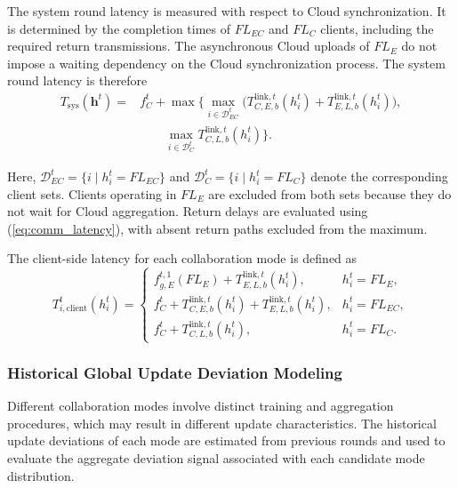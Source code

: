 \documentclass[5p,times]{elsarticle}
\theoremstyle{plain}
\theoremstyle{definition}
\theoremstyle{remark}
\begin{document}
	
	The system round latency is measured
	with respect to Cloud synchronization.
	It is determined by the completion times
	of $FL_{EC}$ and $FL_C$ clients, including
	the required return transmissions.
	The asynchronous Cloud uploads of $FL_E$
	do not impose a waiting dependency on
	the Cloud synchronization process.
	The system round latency is therefore
	\begin{equation}
		\begin{aligned}
			T_{\mathrm{sys}}(\mathbf h^t)
			={}&f_C^t+\max\Bigg\{
			\max_{i\in\mathcal D_{EC}^t}
			\Big(
			T_{C,E,b}^{\mathrm{link},t}(h_i^t)
			+
			T_{E,L,b}^{\mathrm{link},t}(h_i^t)
			\Big),\\
			&\qquad
			\max_{i\in\mathcal D_C^t}
			T_{C,L,b}^{\mathrm{link},t}(h_i^t)
			\Bigg\}.
		\end{aligned}
		\label{eq:system_round_latency}
	\end{equation}
	
	Here, $\mathcal D_{EC}^t=\{i\mid h_i^t=FL_{EC}\}$
	and $\mathcal D_C^t=\{i\mid h_i^t=FL_C\}$
	denote the corresponding client sets.
	Clients operating in \(FL_E\) are excluded
	from both sets because they do not wait for
	Cloud aggregation.
	Return delays are evaluated using
	(\ref{eq:comm_latency}), with absent
	return paths excluded from the maximum.
	
	The client-side latency for each collaboration
	mode is defined as
	\begin{equation}
		T_{i,\mathrm{client}}^t(h_i^t)
		=
		\begin{cases}
			f_{g,E}^{t,1}(FL_E)
			+T_{E,L,b}^{\mathrm{link},t}(h_i^t),
			& h_i^t=FL_E,\\[4pt]
			f_C^t
			+T_{C,E,b}^{\mathrm{link},t}(h_i^t)
			+T_{E,L,b}^{\mathrm{link},t}(h_i^t),
			& h_i^t=FL_{EC},\\[4pt]
			f_C^t
			+T_{C,L,b}^{\mathrm{link},t}(h_i^t),
			& h_i^t=FL_C.
		\end{cases}
		\label{eq:client_latency}
	\end{equation}
	
	\subsubsection{Historical Global Update Deviation Modeling}
	\label{sec:learning_cost}
	
	Different collaboration modes involve distinct
	training and aggregation procedures, which may
	result in different update characteristics.
	The historical update deviations of each mode
	are estimated from previous rounds and used
	to evaluate the aggregate deviation signal
	associated with each candidate mode distribution.
	
\end{document}

